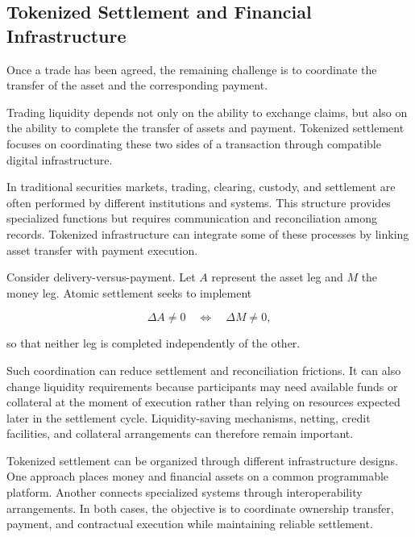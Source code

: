 \subsection{Tokenized Settlement and Financial Infrastructure}

Once a trade has been agreed, the remaining challenge is to coordinate the transfer of the asset and the corresponding payment.

Trading liquidity depends not only on the ability to exchange claims, but also on the ability to complete the transfer of assets and payment. Tokenized settlement focuses on coordinating these two sides of a transaction through compatible digital infrastructure.

In traditional securities markets, trading, clearing, custody, and settlement are often performed by different institutions and systems. This structure provides specialized functions but requires communication and reconciliation among records. Tokenized infrastructure can integrate some of these processes by linking asset transfer with payment execution.

Consider delivery-versus-payment. Let \(A\) represent the asset leg and \(M\) the money leg. Atomic settlement seeks to implement

\begin{equation}
\Delta A \neq 0
\quad\Longleftrightarrow\quad
\Delta M \neq 0,
\label{eq:ch24-atomic-dvp}
\end{equation}

so that neither leg is completed independently of the other.

Such coordination can reduce settlement and reconciliation frictions. It can also change liquidity requirements because participants may need available funds or collateral at the moment of execution rather than relying on resources expected later in the settlement cycle. Liquidity-saving mechanisms, netting, credit facilities, and collateral arrangements can therefore remain important.

Tokenized settlement can be organized through different infrastructure designs. One approach places money and financial assets on a common programmable platform. Another connects specialized systems through interoperability arrangements. In both cases, the objective is to coordinate ownership transfer, payment, and contractual execution while maintaining reliable settlement.

